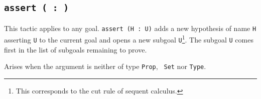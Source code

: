 \subsection{{\tt assert ( {\ident} : {\form} \tt )}
}

This tactic applies to any goal. {\tt assert (H : U)} adds a new
hypothesis of name \texttt{H} asserting \texttt{U} to the current goal
and opens a new subgoal \texttt{U}\footnote{This corresponds to the
  cut rule of sequent calculus.}. The subgoal {\texttt U} comes first
in the list of subgoals remaining to prove.

\begin{ErrMsgs}
\item {}
  
  Arises when the argument {\form} is neither of type {\tt Prop}, {\tt
    Set} nor {\tt Type}.

\end{ErrMsgs}


